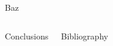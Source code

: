 \documentclass[english,xcolor=table,t
]{beamer}
\begin{document}
\begin{frame}
\begin{columns}
\begin{block}{Baz}
\end{block}

\end{columns}

\begin{columns}


\begin{block}{Conclusions}

\lipsum[12]

\vskip1.4cm

\end{block}


\begin{block}{Bibliography}

\printbibliography

\vskip7.3cm

\end{block}

\end{columns}

\end{frame}
\end{document}
